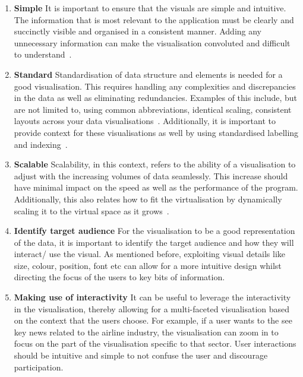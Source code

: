 \begin{enumerate}
\item \textbf{Simple}
It is important to ensure that the visuals are simple and intuitive. The information that is most relevant to the application must be clearly and succinctly visible and organised in a consistent manner. Adding any unnecessary information can make the visualisation convoluted and difficult to understand~\cite{29_bhalla_2022}. 

\item \textbf{Standard}
Standardisation of data structure and elements is needed for a good visualisation. This requires handling any complexities and discrepancies in the data as well as eliminating redundancies. Examples of this include, but are not limited to, using common abbreviations, identical scaling, consistent layouts across your data visualisations~\cite{29_bhalla_2022}. Additionally, it is important to provide context for these visualisations as well by using standardised labelling and indexing~\cite{30_vis}.

\item \textbf{Scalable}
Scalability, in this context, refers to the ability of a visualisation to adjust with the increasing volumes of data seamlessly. This increase should have minimal impact on the speed as well as the performance of the program. Additionally, this also relates how to fit the virtualisation by dynamically scaling it to the virtual space as it grows~\cite{29_bhalla_2022}. 

\item \textbf{Identify target audience}
 For the visualisation to be a good representation of the data, it is important to identify the target audience and how they will interact/ use the visual. As mentioned before, exploiting visual details like size, colour, position, font etc can allow for a more intuitive design whilst directing the focus of the users to key bits of information\cite{30_vis}. 

\item \textbf{Making use of interactivity}
It can be useful to leverage the interactivity in the visualisation, thereby allowing for a multi-faceted visualisation based on the context that the users choose. For example, if a user wants to the see key news related to the airline industry, the visualisation can zoom in to focus on the part of the visualisation specific to that sector. User interactions should be intuitive and simple to not confuse the user and discourage participation. 

\end{enumerate}


